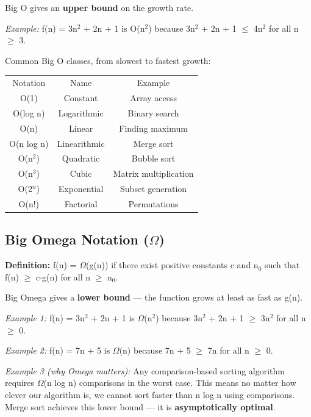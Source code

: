 Big O gives an \textbf{upper bound} on the growth rate.

\textit{Example:} f(n) = 3n$^{2}$ + 2n + 1 is O(n$^{2}$) because 3n$^{2}$ + 2n + 1 $\le $ 4n$^{2}$ for all n $\ge $ 3.

Common Big O classes, from slowest to fastest growth:

\begin{center}
\begin{tabular}{ccc}
\toprule
Notation & Name & Example \\
O(1) & Constant & Array\index{array} access \\
O(log n) & Logarithmic & Binary search \\
O(n) & Linear & Finding maximum \\
O(n log n) & Linearithmic & Merge sort \\
O(n$^{2}$) & Quadratic & Bubble sort \\
O(n$^{3}$) & Cubic & Matrix\index{matrix} multiplication \\
O(2$^{n}$) & Exponential & Subset generation \\
O(n!) & Factorial & Permutations \\

\bottomrule
\end{tabular}
\end{center}
\subsection{Big Omega Notation (\texorpdfstring{$\Omega$}{Omega})}

\textbf{Definition:} f(n) = $\Omega $(g(n)) if there exist positive constants c and n$_{0}$ such that f(n) $\ge $ c$\cdot $g(n) for all n $\ge $ n$_{0}$.

Big Omega gives a \textbf{lower bound} — the function grows at least as fast as g(n).

\textit{Example 1:} f(n) = 3n$^{2}$ + 2n + 1 is $\Omega $(n$^{2}$) because 3n$^{2}$ + 2n + 1 $\ge $ 3n$^{2}$ for all n $\ge $ 0.

\textit{Example 2:} f(n) = 7n + 5 is $\Omega $(n) because 7n + 5 $\ge $ 7n for all n $\ge $ 0.

\textit{Example 3 (why Omega matters):} Any comparison-based sorting algorithm requires $\Omega $(n log n) comparisons in the worst case. This means no matter how clever our algorithm is, we cannot sort faster than n log n using comparisons. Merge sort achieves this lower bound — it is \textbf{asymptotically optimal}.

